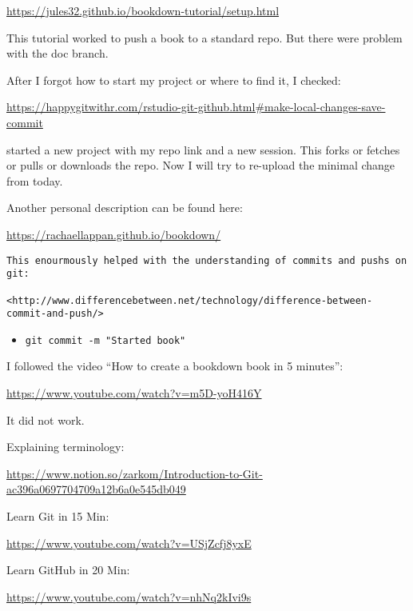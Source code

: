 \documentclass[
]{book}
\providecommand{\tightlist}{%
  \setlength{\itemsep}{0pt}\setlength{\parskip}{0pt}}
\begin{document}
\url{https://jules32.github.io/bookdown-tutorial/setup.html}

This tutorial worked to push a book to a standard repo. But there were problem with the doc branch.

After I forgot how to start my project or where to find it, I checked:

\url{https://happygitwithr.com/rstudio-git-github.html\#make-local-changes-save-commit}

started a new project with my repo link and a new session. This forks or fetches or pulls or downloads the repo. Now I will try to re-upload the minimal change from today.

Another personal description can be found here:

\url{https://rachaellappan.github.io/bookdown/}

\begin{verbatim}
This enourmously helped with the understanding of commits and pushs on git:

<http://www.differencebetween.net/technology/difference-between-commit-and-push/>
\end{verbatim}

\begin{itemize}
\tightlist
\item
  \texttt{git\ commit\ -m\ "Started\ book"}
\end{itemize}

I followed the video ``How to create a bookdown book in 5 minutes'':

\url{https://www.youtube.com/watch?v=m5D-yoH416Y}

It did not work.

Explaining terminology:

\url{https://www.notion.so/zarkom/Introduction-to-Git-ac396a0697704709a12b6a0e545db049}

Learn Git in 15 Min:

\url{https://www.youtube.com/watch?v=USjZcfj8yxE}

Learn GitHub in 20 Min:

\url{https://www.youtube.com/watch?v=nhNq2kIvi9s}

  
\end{document}
